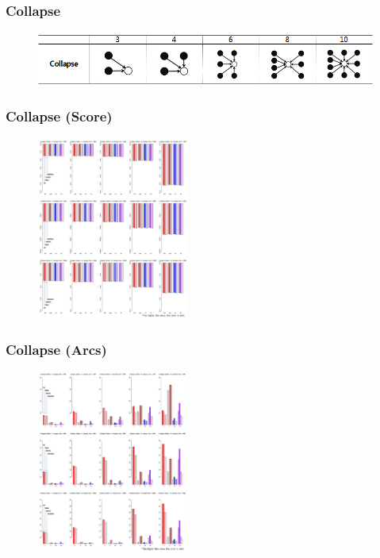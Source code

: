 \documentclass{beamer}
\begin{document}
\begin{frame}
\frametitle{Collapse}
{\scriptsize{}
	\begin{figure}
		\includegraphics[height=50pt]{images/Topologies_Collapse}
	\end{figure}	
}
\end{frame}



\begin{frame}
\frametitle{Collapse (Score)}
{\scriptsize{}
	\begin{figure}
		\includegraphics[height=170pt]{images/01_Collapse_Score}
	\end{figure}	
}
\end{frame}


\begin{frame}
\frametitle{Collapse (Arcs)}
{\scriptsize{}
	\begin{figure}
		\includegraphics[height=170pt]{images/01_Collapse_Arcs}
	\end{figure}	
}
\end{frame}
\end{document}
